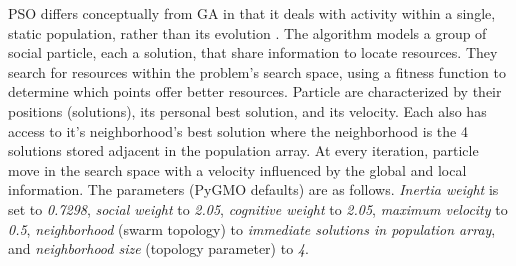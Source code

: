 \documentclass{tamuccthesis}
\begin{document}
PSO differs conceptually from GA in that it deals with activity within a single, static population, rather than its evolution \cite{pso:nie:2016}. The algorithm models a group of social particle, each a solution, that share information to locate resources. They search for resources within the problem's search space, using a fitness function to determine which points offer better resources. Particle are characterized by their positions (solutions), its personal best solution, and its velocity. Each also has access to it's neighborhood's best solution where the neighborhood is the 4 solutions stored adjacent in the population array. At every iteration, particle move in the search space with a velocity influenced by the global and local information. The parameters (PyGMO defaults) are as follows. \textit{Inertia weight} is set to \textit{0.7298}, \textit{social weight} to \textit{2.05}, \textit{cognitive weight} to \textit{2.05}, \textit{maximum velocity} to \textit{0.5}, \textit{neighborhood} (swarm topology) to \textit{immediate solutions in population array}, and \textit{neighborhood size} (topology parameter) to \textit{4}. 

\end{document}
